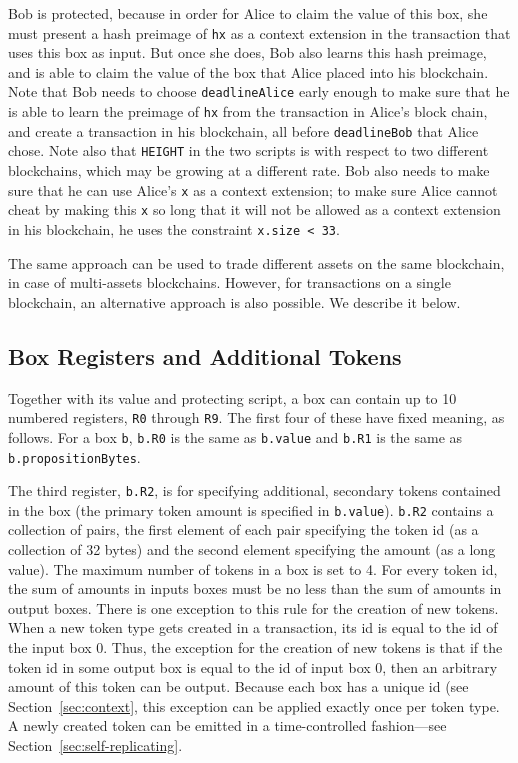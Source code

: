 \documentclass[11pt]{article}
\begin{document}
Bob is protected, because in order for Alice to claim the value of this box, she must present a hash preimage of \texttt{hx} as a context extension in the transaction that uses this box as input. But once she does, Bob also learns this hash preimage, and is able to claim the value of the box that Alice placed into his blockchain. Note that Bob needs to choose \texttt{deadlineAlice} early enough to make sure that he is able to learn the preimage of \texttt{hx} from the transaction in Alice's block chain, and create a transaction in his blockchain, all before \texttt{deadlineBob} that Alice chose. Note also that \texttt{HEIGHT} in the two scripts is with respect to two different blockchains, which may be growing at a different rate. Bob also needs to make sure that he can use Alice's \texttt{x} as a context extension; to make sure Alice cannot cheat by making this \texttt{x} so long that it will not be allowed as a context extension in his blockchain, he uses the constraint \texttt{x.size < 33}.

The same approach can be used to trade different assets on the same blockchain, in case of multi-assets blockchains. However, for transactions on a single blockchain, an alternative approach is also possible. We describe it below.

\subsection{Box Registers and Additional Tokens}
\label{sec:box-registers}
Together with its value and protecting script, a box can contain up to 10 numbered registers, \texttt{R0} through \texttt{R9}. The first four of these have fixed meaning, as follows. For a box \texttt{b}, \texttt{b.R0} is the same as \texttt{b.value} and \texttt{b.R1} is the same as \texttt{b.propositionBytes}.


The third register, \texttt{b.R2}, is for specifying additional, secondary tokens contained in the box (the primary token amount is specified in \texttt{b.value}). \texttt{b.R2} contains a collection of pairs, the first element of each pair specifying the token id (as a collection of 32 bytes) and the second element specifying the amount (as a long value). The maximum number of tokens in a box is set to 4. For every token id, the sum of amounts in inputs boxes must be no less than the sum of amounts in output boxes. There is one exception to this rule for the creation of new tokens. When a new token type gets created in a transaction, its id is equal to the id of the input box 0. Thus, the exception for the creation of new tokens is that if the token id in some output box is equal to the id of input box 0, then an arbitrary amount of this token can be output. Because each box has a unique id (see Section~\ref{sec:context}, this exception can be applied exactly once per token type. A newly created token can be emitted in a time-controlled fashion---see Section~\ref{sec:self-replicating}.
\end{document}
